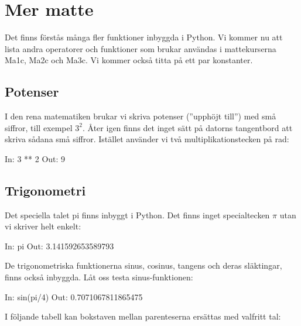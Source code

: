 \section{Mer matte}
Det finns förstås många fler funktioner inbyggda i Python. Vi kommer nu att lista andra operatorer och funktioner som brukar användas i mattekurserna Ma1c, Ma2c och Ma3c. Vi kommer också titta på ett par konstanter.


\subsection{Potenser}

I den rena matematiken brukar vi skriva potenser (''upphöjt till'') med små siffror, till exempel $3^2$. Åter igen finns det inget sätt på datorns tangentbord att skriva sådana små siffror. Istället använder vi två multiplikationstecken på rad:

\begin{python}[caption={Potenser},label={}]
In: 3 ** 2
Out: 9
\end{python}


\subsection{Trigonometri}

Det speciella talet pi finns inbyggt i Python. Det finns inget specialtecken $\pi$ utan vi skriver helt enkelt:

\begin{python}[caption={pi},label={}]
In: pi
Out: 3.141592653589793
\end{python}

De trigonometriska funktionerna sinus, cosinus, tangens och deras släktingar, finns också inbyggda. Låt oss testa sinus-funktionen:

\begin{python}[caption={Trigonometri},label={}]
In: sin(pi/4)
Out: 0.7071067811865475
\end{python}

I följande tabell kan bokstaven  mellan parenteserna ersättas med valfritt tal:

